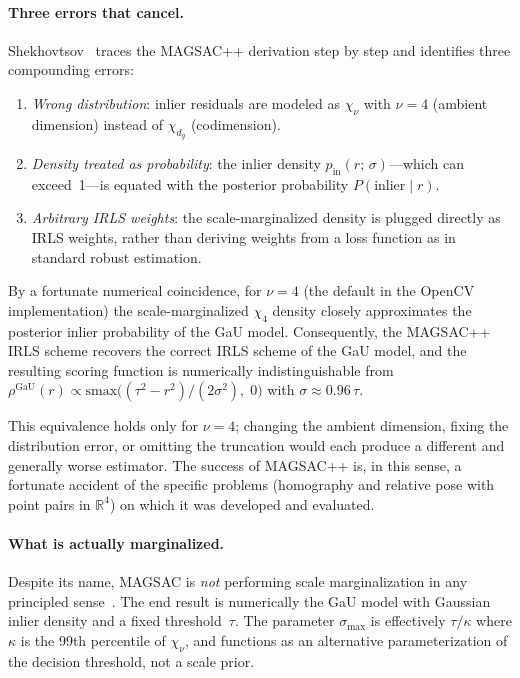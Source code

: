\documentclass[11pt]{article}
\begin{document}
\paragraph{Three errors that cancel.}
Shekhovtsov~\cite{shekhovtsov2025scoring} traces the MAGSAC++
derivation step by step and identifies three compounding errors:
\begin{enumerate}
  \item \emph{Wrong distribution}: inlier residuals are modeled as
    $\chi_\nu$ with $\nu = 4$ (ambient dimension) instead of
    $\chi_{d_g}$ (codimension).
  \item \emph{Density treated as probability}: the inlier density
    $p_{\mathrm{in}}(r;\, \sigma)$---which can exceed~1---is equated
    with the posterior probability $P(\text{inlier} \mid r)$.
  \item \emph{Arbitrary IRLS weights}: the scale-marginalized density
    is plugged directly as IRLS weights, rather than deriving weights
    from a loss function as in standard robust estimation.
\end{enumerate}
By a fortunate numerical coincidence, for $\nu = 4$ (the default in
the OpenCV implementation) the scale-marginalized $\chi_4$ density
closely approximates the posterior inlier probability of the GaU
model.  Consequently, the MAGSAC++ IRLS scheme recovers the correct
IRLS scheme of the GaU model, and the resulting scoring function is
numerically indistinguishable from
$\rho^{\mathrm{GaU}}(r) \propto \mathrm{smax}\bigl((\tau^2 -
r^2)/(2\sigma^2),\; 0\bigr)$
with $\sigma \approx 0.96\,\tau$.

This equivalence holds only for $\nu = 4$; changing the ambient
dimension, fixing the distribution error, or omitting the truncation
would each produce a different and generally worse estimator.  The
success of MAGSAC++ is, in this sense, a fortunate accident of the
specific problems (homography and relative pose with point pairs in
$\mathbb{R}^4$) on which it was developed and evaluated.

\paragraph{What is actually marginalized.}
Despite its name, MAGSAC is \emph{not} performing scale
marginalization in any principled
sense~\cite{shekhovtsov2025scoring}.  The end result is numerically
the GaU model with Gaussian inlier density and a fixed
threshold~$\tau$.  The parameter $\sigma_{\max}$ is effectively
$\tau / \kappa$ where $\kappa$ is the 99th percentile of $\chi_\nu$,
and functions as an alternative parameterization of the decision
threshold, not a scale prior.
\end{document}
